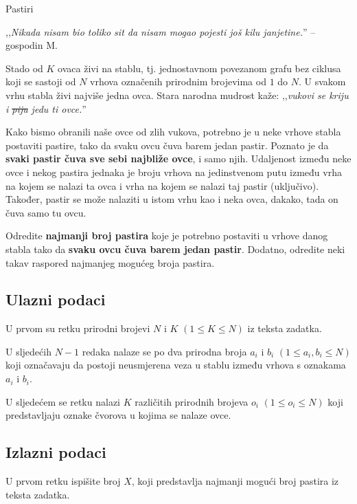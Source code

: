 \begin{statement}[
  problempoints=100,
  timelimit=1 sekunda,
  memorylimit=512 MiB,
]{Pastiri}

,,\textit{Nikada nisam bio toliko sit da nisam mogao pojesti još kilu
janjetine.}'' -- gospodin M.

Stado od $K$ ovaca živi na stablu, tj. jednostavnom povezanom grafu bez ciklusa
koji se sastoji od $N$ vrhova označenih prirodnim brojevima od $1$ do $N$.  U
svakom vrhu stabla živi najviše jedna ovca.  Stara narodna mudrost kaže:
,,\textit{vukovi se kriju i \sout{piju} jedu ti ovce.}''

Kako bismo obranili naše ovce od zlih vukova, potrebno je u neke vrhove stabla
postaviti pastire, tako da svaku ovcu čuva barem jedan pastir. Poznato je da
\textbf{svaki pastir čuva sve sebi najbliže ovce}, i samo njih. Udaljenost
između neke ovce i nekog pastira jednaka je broju vrhova na jedinstvenom
putu između vrha na kojem se nalazi ta ovca i vrha na kojem se nalazi taj
pastir (uključivo). Također, pastir se
može nalaziti u istom vrhu kao i neka ovca, dakako, tada on čuva samo tu
ovcu.

Odredite \textbf{najmanji broj pastira} koje je potrebno postaviti u vrhove
danog stabla tako da \textbf{svaku ovcu čuva barem jedan pastir}. Dodatno,
odredite neki takav raspored najmanjeg mogućeg broja pastira.

\subsection*{Ulazni podaci}
U prvom su retku prirodni brojevi $N$ i $K$ $(1 \le K \le N)$ iz teksta zadatka.

U sljedećih $N-1$ redaka nalaze se po dva prirodna broja $a_i$ i $b_i$ $(1 \le
a_i, b_i \le N)$ koji označavaju da postoji neusmjerena veza u stablu između
vrhova s oznakama $a_i$ i $b_i$.

U sljedećem se retku nalazi $K$ različitih prirodnih brojeva $o_i$ $(1 \le o_i
\le N)$ koji predstavljaju oznake čvorova u kojima se nalaze ovce.

\subsection*{Izlazni podaci}
U prvom retku ispišite broj $X$, koji predstavlja najmanji mogući broj pastira
iz teksta zadatka.


\end{statement}
